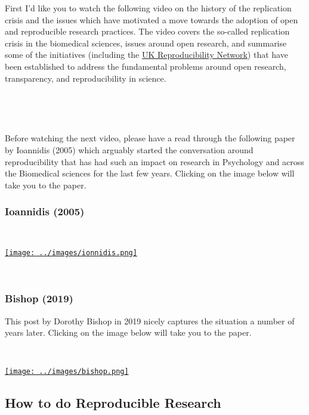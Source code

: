 \documentclass[
]{book}
\begin{document}
First I'd like you to watch the following video on the history of the replication crisis and the issues which have motivated a move towards the adoption of open and reproducible research practices. The video covers the so-called replication crisis in the biomedical sciences, issues around open research, and summarise some of the initiatives (including the \href{https://www.bristol.ac.uk/psychology/research/ukrn/}{UK Reproducibility Network}) that have been established to address the fundamental problems around open research, transparency, and reproducibility in science.

~~

~~

Before watching the next video, please have a read through the following paper by Ioannidis (2005) which arguably started the conversation around reproducibility that has had such an impact on research in Psychology and across the Biomedical sciences for the last few years. Clicking on the image below will take you to the paper.

\hypertarget{ioannidis-2005}{%
\subsubsection*{Ioannidis (2005)}\label{ioannidis-2005}}

~~

\href{https://journals.plos.org/plosmedicine/article?id=10.1371/journal.pmed.0020124}{\texttt{[image: ../images/ionnidis.png]}}

~~

\hypertarget{bishop-2019}{%
\subsubsection*{Bishop (2019)}\label{bishop-2019}}

This post by Dorothy Bishop in 2019 nicely captures the situation a number of years later. Clicking on the image below will take you to the paper.

~~

\href{https://www.nature.com/articles/d41586-019-01307-2}{\texttt{[image: ../images/bishop.png]}}

\hypertarget{how-to-do-reproducible-research}{%
\subsection{How to do Reproducible Research}\label{how-to-do-reproducible-research}}
\end{document}
